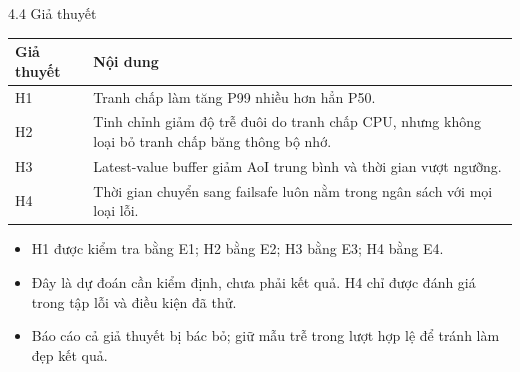 \documentclass[aspectratio=169,12pt,t]{beamer}
\renewcommand{\arraystretch}{1.02}
\begin{document}
\begin{frame}{4.4 Giả thuyết}
\relax
\normalsize

\renewcommand{\arraystretch}{1.35}
\begin{tabular}{@{}L{.13\textwidth} L{.81\textwidth}@{}}
\toprule
\textbf{Giả thuyết} & \textbf{Nội dung}\\\midrule
H1 & Tranh chấp làm tăng P99 nhiều hơn hẳn P50.\\
H2 & Tinh chỉnh giảm độ trễ đuôi do tranh chấp CPU, nhưng không loại bỏ tranh chấp băng thông bộ nhớ.\\
H3 & Latest-value buffer giảm AoI trung bình và thời gian vượt ngưỡng.\\
H4 & Thời gian chuyển sang failsafe luôn nằm trong ngân sách với mọi loại lỗi.\\
\bottomrule
\end{tabular}\par

\vfill
\begin{itemize}
\item H1 được kiểm tra bằng E1; H2 bằng E2; H3 bằng E3; H4 bằng E4.
\item Đây là dự đoán cần kiểm định, chưa phải kết quả. H4 chỉ được đánh giá trong tập lỗi và điều kiện đã thử.
\item Báo cáo cả giả thuyết bị bác bỏ; giữ mẫu trễ trong lượt hợp lệ để tránh làm đẹp kết quả.
\end{itemize}
\end{frame}
\end{document}
